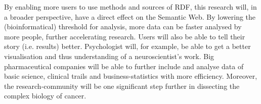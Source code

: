 \documentclass[twoside,fontsize=10pt]{article}
\renewcommand\thesection{\Roman{section}} %
\begin{document}
By enabling more users to use methods and sources of RDF, this research will, in a broader perspective, have a direct effect on the Semantic Web. By lowering the (bioinformatical) threshold for analysis, more data can be faster analysed by more people, further accelerating research. Users will also be able to tell their story (i.e. results) better. Psychologist will, for example, be able to get a better visualisation and thus understanding of a neuroscientist's work. Big pharmaceutical companies will be able to further include and analyse data of basic science, clinical trails and business-statistics with more efficiency. Moreover, the research-community will be one significant step further in dissecting the complex biology of cancer.


%
%
%






\begin{tiny}


 \end{tiny}
%
%
\end{document}
